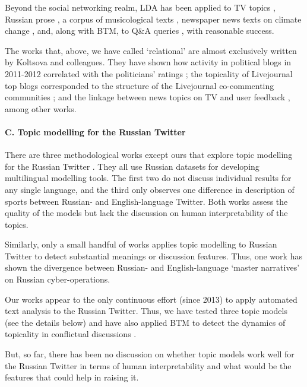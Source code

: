 Beyond the social networking realm, LDA has been applied to TV topics \cite{KoltsovaPashakhin}, Russian prose \cite{SedovaMitrofanova}, a corpus of musicological texts \cite{Mitrofanova}, newspaper news texts on climate change \cite{BoussalisCoanPoberezhskaya}, and, along with BTM, to Q\&A queries \cite{VolskeBraslavskiHagen}, with reasonable success.

The works that, above, we have called ‘relational’ are almost exclusively written by Koltsova and colleagues. They have shown how activity in political blogs in 2011-2012 correlated with the politicians’ ratings \cite{KoltsovaShcherbak}; the topicality of Livejournal top blogs corresponded to the structure of the Livejournal co-commenting communities \cite{KoltsovaKoltcovNikolenko}; and the linkage between news topics on TV and user feedback \cite{KoltsovPashakhinDokuka}, among other works.

\paragraph{C. Topic modelling for the Russian Twitter}
There are three methodological works except ours that explore topic modelling for the Russian Twitter \cite{MimnoWallachNaradowsky,Sridhar,GutierrezShutovaLichtenstein}. They all use Russian datasets for developing multilingual modelling tools. The first two do not discuss individual results for any single language, and the third only observes one difference in description of sports between Russian- and English-language Twitter. Both works assess the quality of the models but lack the discussion on human interpretability of the topics.

Similarly, only a small handful of works applies topic modelling to Russian Twitter to detect substantial meanings or discussion features. Thus, one work \cite{ChewTurnley} has shown the divergence between Russian- and English-language ‘master narratives’ on Russian cyber-operations.

Our works appear to the only continuous effort (since 2013) to apply automated text analysis to the Russian Twitter. Thus, we have tested three topic models \cite{BlekanovTarasovMaksimov} (see the details below) and have also applied BTM to detect the dynamics of topicality in conflictual discussions \cite{SmoliarovaBodrunovaYakunin}.

But, so far, there has been no discussion on whether topic models work well for the Russian Twitter in terms of human interpretability and what would be the features that could help in raising it.

